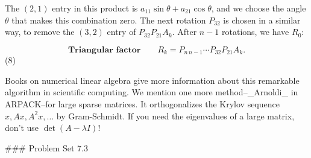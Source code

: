 The \((2,1)\) entry in this product is \(a_{11}\sin\theta+a_{21}\cos\theta\), and we choose the angle \(\theta\) that makes this combination zero. The next rotation \(P_{32}\) is chosen in a similar way, to remove the \((3,2)\) entry of \(P_{32}P_{21}A_{k}\). After \(n-1\) rotations, we have \(R_{0}\):

\[\textbf{Triangular factor}\qquad R_{k}=P_{n\,n-1}\cdots P_{32}P_{21}A_{k}.\] (8)

Books on numerical linear algebra give more information about this remarkable algorithm in scientific computing. We mention one more method--_Arnoldi_ in ARPACK--for large sparse matrices. It orthogonalizes the Krylov sequence \(x,Ax,A^{2}x,\ldots\) by Gram-Schmidt. If you need the eigenvalues of a large matrix, don't use \(\det(A-\lambda I)!\)

### Problem Set 7.3

